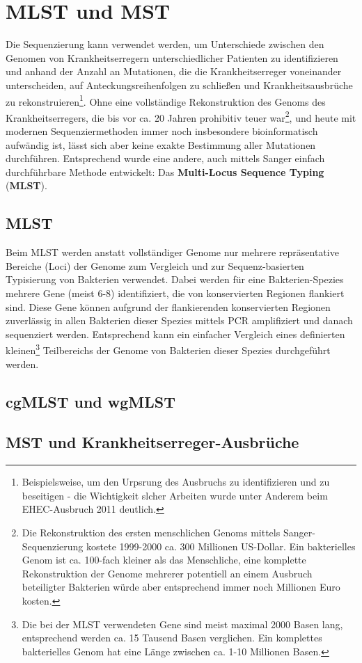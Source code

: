 \section{MLST und MST}

Die Sequenzierung kann verwendet werden, um Unterschiede zwischen den Genomen von Krankheitserregern unterschiedlicher Patienten zu identifizieren und anhand der Anzahl an Mutationen, die die Krankheitserreger voneinander unterscheiden, auf Anteckungsreihenfolgen zu schließen und Krankheitsausbrüche zu rekonstruieren\footnote{Beispielsweise, um den Urpsrung des Ausbruchs zu identifizieren und zu beseitigen - die Wichtigkeit slcher Arbeiten wurde unter Anderem beim EHEC-Ausbruch 2011 deutlich.}. Ohne eine vollständige Rekonstruktion des Genoms des Krankheitserregers, die bis vor ca. 20 Jahren prohibitiv teuer war\footnote{Die Rekonstruktion des ersten menschlichen Genoms mittels Sanger-Sequenzierung kostete 1999-2000 ca. 300 Millionen US-Dollar. Ein bakterielles Genom ist ca. 100-fach kleiner als das Menschliche, eine komplette Rekonstruktion der Genome mehrerer potentiell an einem Ausbruch beteiligter Bakterien würde aber entsprechend immer noch Millionen Euro kosten.}, und heute mit modernen Sequenziermethoden immer noch insbesondere bioinformatisch aufwändig ist, lässt sich aber keine exakte Bestimmung aller Mutationen durchführen. Entsprechend wurde eine andere, auch mittels Sanger einfach durchführbare Methode entwickelt: Das \textbf{Multi-Locus Sequence Typing} (\textbf{MLST}).

\subsection{MLST}

Beim MLST werden anstatt vollständiger Genome nur mehrere repräsentative Bereiche (Loci) der Genome zum Vergleich und zur Sequenz-basierten Typisierung von Bakterien verwendet. Dabei werden für eine Bakterien-Spezies mehrere Gene (meist 6-8) identifiziert, die von konservierten Regionen flankiert sind. Diese Gene können aufgrund der flankierenden konservierten Regionen zuverlässig in allen Bakterien dieser Spezies mittels PCR amplifiziert und danach sequenziert werden. Entsprechend kann ein einfacher Vergleich eines definierten kleinen\footnote{Die bei der MLST verwendeten Gene sind meist maximal 2000 Basen lang, entsprechend werden ca. 15 Tausend Basen verglichen. Ein komplettes bakterielles Genom hat eine Länge zwischen ca. 1-10 Millionen Basen.} Teilbereichs der Genome von Bakterien dieser Spezies durchgeführt werden.  

\subsection{cgMLST und wgMLST}

\subsection{MST und Krankheitserreger-Ausbrüche}
